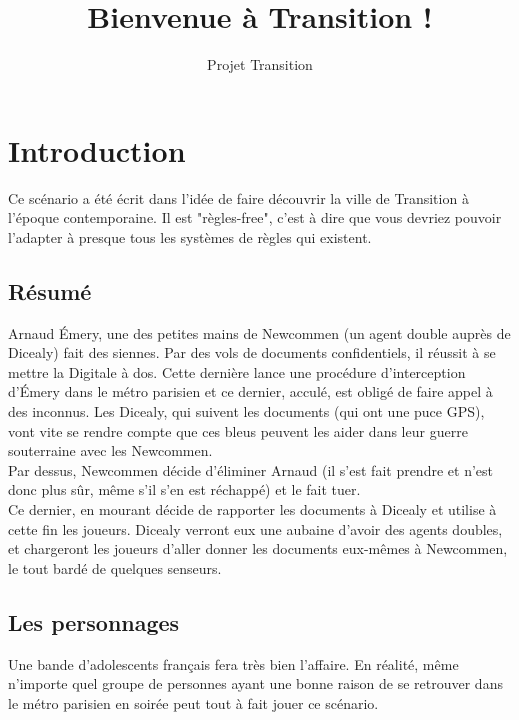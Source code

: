 \documentclass[10pt,a4paper,twocolumn]{article}
\author{Projet Transition}
\title{Bienvenue à Transition !}
\begin{document}
\maketitle
\section{Introduction}
Ce scénario a été écrit dans l'idée de faire découvrir la ville de Transition à l'époque contemporaine. Il est "règles-free", c'est à dire que vous devriez pouvoir l'adapter à presque tous les systèmes de règles qui existent.
\subsection{Résumé}
Arnaud Émery, une des petites mains de Newcommen (un agent double auprès de Dicealy) fait des siennes. Par des vols de documents confidentiels, il réussit à se mettre la Digitale à dos. Cette dernière lance une procédure d'interception d'Émery dans le métro parisien et ce dernier, acculé, est obligé de faire appel à des inconnus. Les Dicealy, qui suivent les documents (qui ont une puce GPS), vont vite se rendre compte que ces bleus peuvent les aider dans leur guerre souterraine avec les Newcommen.\\
Par dessus, Newcommen décide d'éliminer Arnaud (il s'est fait prendre et n'est donc plus sûr, même s'il s'en est réchappé) et le fait tuer.\\
Ce dernier, en mourant décide de rapporter les documents à Dicealy et utilise à cette fin les joueurs. Dicealy verront eux une aubaine d'avoir des agents doubles, et chargeront les joueurs d'aller donner les documents eux-mêmes à Newcommen, le tout bardé de quelques senseurs.
\subsection{Les personnages}
Une bande d'adolescents français fera très bien l'affaire. En réalité, même n'importe quel groupe de personnes ayant une bonne raison de se retrouver dans le métro parisien en soirée peut tout à fait jouer ce scénario.
\end{document}
